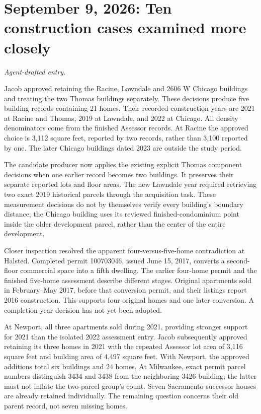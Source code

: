 \clearpage
\section*{September 9, 2026: Ten construction cases examined more closely}
\textit{Agent-drafted entry.}

Jacob approved retaining the Racine, Lawndale and 2606 W Chicago buildings and treating the two Thomas buildings separately. These decisions produce five building records containing 21 homes. Their recorded construction years are 2021 at Racine and Thomas, 2019 at Lawndale, and 2022 at Chicago. All density denominators come from the finished Assessor records. At Racine the approved choice is 3,112 square feet, reported by two records, rather than 3,100 reported by one. The later Chicago buildings dated 2023 are outside the study period.

The candidate producer now applies the existing explicit Thomas component decisions when one earlier record becomes two buildings. It preserves their separate reported lots and floor areas. The new Lawndale year required retrieving two exact 2019 historical parcels through the acquisition task. These measurement decisions do not by themselves verify every building's boundary distance; the Chicago building uses its reviewed finished-condominium point inside the older development parcel, rather than the center of the entire development.

Closer inspection resolved the apparent four-versus-five-home contradiction at Halsted. Completed permit 100703046, issued June 15, 2017, converts a second-floor commercial space into a fifth dwelling. The earlier four-home permit and the finished five-home assessment describe different stages. Original apartments sold in February--May 2017, before that conversion permit, and their listings report 2016 construction. This supports four original homes and one later conversion. A completion-year decision has not yet been adopted.

At Newport, all three apartments sold during 2021, providing stronger support for 2021 than the isolated 2022 assessment entry. Jacob subsequently approved retaining its three homes in 2021 with the repeated Assessor lot area of 3,116 square feet and building area of 4,497 square feet. With Newport, the approved additions total six buildings and 24 homes. At Milwaukee, exact permit parcel numbers distinguish 3434 and 3438 from the neighboring 3426 building; the latter must not inflate the two-parcel group's count. Seven Sacramento successor houses are already retained individually. The remaining question concerns their old parent record, not seven missing homes.

